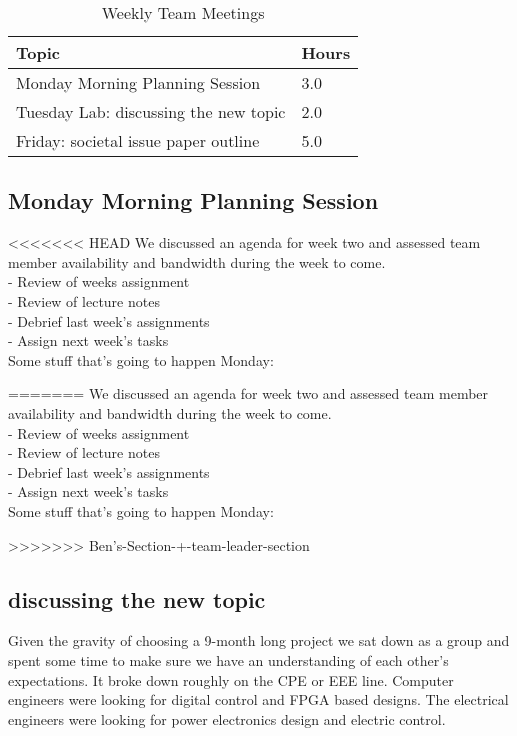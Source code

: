 \documentclass[12pt,article,compsoc]{IEEEtran}
\begin{document}
	
	\begin{table}[ht]
		\renewcommand{\arraystretch}{1.3}
			\caption{Weekly Team Meetings}
			
			\label{Team Hour Summary}
			
			\centering
			\begin{tabular}{p{7cm}|p{1cm}}
			\hline
			\bfseries 		Topic 									& \bfseries Hours\\
			\hline\hline
						Monday Morning Planning Session				& 3.0					\\
						Tuesday Lab: discussing the new topic 			& 2.0					\\	
						Friday: societal issue paper outline				& 5.0					\\	
			\hline
			\end{tabular}
		\end{table}
		 
	\subsection{Monday Morning Planning Session}
<<<<<<< HEAD
		We discussed an agenda for week two and assessed team member availability and bandwidth during the week to come. \\
		-	Review of weeks assignment				\\
		-	Review of lecture notes					\\
		-	Debrief last week’s assignments			\\
		-	Assign next week’s tasks				\\
		Some stuff that’s going to happen Monday:
		
=======
		We discussed an agenda for week two and assessed team member availability and bandwidth during the week to come. \\
		-	Review of weeks assignment				\\
		-	Review of lecture notes					\\
		-	Debrief last week’s assignments				\\
		-	Assign next week’s tasks					\\
		Some stuff that’s going to happen Monday:
		
>>>>>>> Ben's-Section-+-team-leader-section
	\subsection{discussing the new topic}
		Given the gravity of choosing a 9-month long project we sat down as a group and spent some time to make sure 
		we have an understanding of each other’s expectations. It broke down roughly on the CPE or EEE line. Computer 
		engineers were looking for digital control and FPGA based designs. The electrical engineers were looking for 
		power electronics design and electric control.  
		
\end{document}
